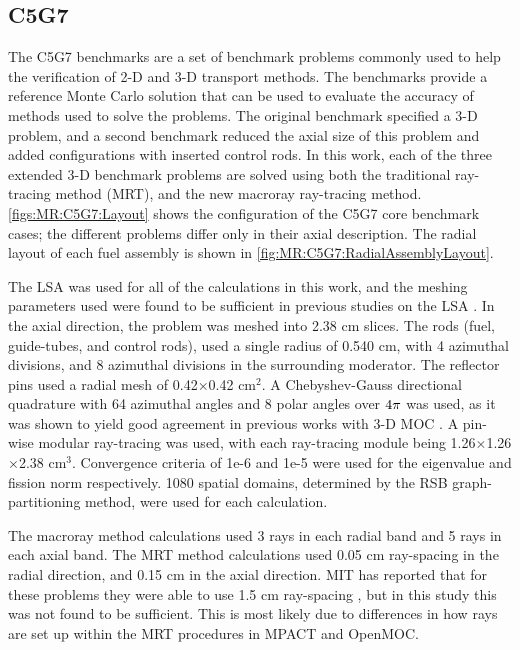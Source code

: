 {{    \subsection{C5G7}{\label{ssec:MR:C5G7}
      The C5G7 \cite{Smith2002,Smith2006} benchmarks are a set of benchmark problems commonly used to help the verification of 2-D and 3-D transport methods.
      The benchmarks provide a reference Monte Carlo solution that can be used to evaluate the accuracy of methods used to solve the problems.
      The original benchmark specified a 3-D problem, and a second benchmark reduced the axial size of this problem and added configurations with inserted control rods.
      In this work, each of the three extended 3-D benchmark problems are solved using both the traditional ray-tracing method (\ac{MRT}), and the new macroray ray-tracing method.
      \cref{figs:MR:C5G7:Layout} shows the configuration of the C5G7 core benchmark cases; the different problems differ only in their axial description.
      The radial layout of each fuel assembly is shown in \cref{fig:MR:C5G7:RadialAssemblyLayout}.

      The \ac{LSA} was used for all of the calculations in this work, and the meshing parameters used were found to be sufficient in previous studies on the \ac{LSA} \cite{Gunow2016}.
      In the axial direction, the problem was meshed into 2.38 cm slices.
      The rods (fuel, guide-tubes, and control rods), used a single radius of 0.540 cm, with 4 azimuthal divisions, and 8 azimuthal divisions in the surrounding moderator.
      The reflector pins used a radial mesh of 0.42$\times$0.42 cm$^2$.
      A Chebyshev-Gauss directional quadrature with 64 azimuthal angles and 8 polar angles over $4\pi$ was used, as it was shown to yield good agreement in previous works with 3-D \ac{MOC} \cite{Kochunas2013}.
      A pin-wise modular ray-tracing was used, with each ray-tracing module being 1.26$\times$1.26$\times$2.38 cm$^3$.
      Convergence criteria of 1e-6 and 1e-5 were used for the eigenvalue and fission norm respectively.
      1080 spatial domains, determined by the \ac{RSB} graph-partitioning method, were used for each calculation.

      The macroray method calculations used 3 rays in each radial band and 5 rays in each axial band.
      The \ac{MRT} method calculations used 0.05 cm ray-spacing in the radial direction, and 0.15 cm in the axial direction.
      \ac{MIT} has reported that for these problems they were able to use 1.5 cm ray-spacing \cite{Gunow2016}, but in this study this was not found to be sufficient.
      This is most likely due to differences in how rays are set up within the \ac{MRT} procedures in MPACT and OpenMOC.

}}}
